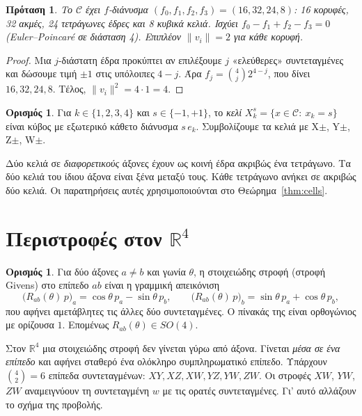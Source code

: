 \documentclass[10pt,a4paper]{article}
\theoremstyle{plain}
\newtheorem{proposition}[theorem]{Πρόταση}
\theoremstyle{definition}
\newtheorem{definition}[theorem]{Ορισμός}
\newcommand{\R}{\mathbb{R}}
\newcommand{\C}{\mathcal{C}}
\newcommand{\eng}[1]{\textenglish{#1}}
\begin{document}
\begin{proposition}\label{prop:fvector}
Το $\C$ έχει $f$-διάνυσμα $(f_0,f_1,f_2,f_3)=(16,32,24,8)$: 16 κορυφές, 32 ακμές, 24 τετράγωνες έδρες και 8 κυβικά κελιά. Ισχύει $f_0-f_1+f_2-f_3=0$ (Euler–Poincaré σε διάσταση 4). Επιπλέον $\|v_i\|=2$ για κάθε κορυφή.
\end{proposition}
\begin{proof}
Μια $j$-διάστατη έδρα προκύπτει αν επιλέξουμε $j$ «ελεύθερες» συντεταγμένες και δώσουμε τιμή $\pm1$ στις υπόλοιπες $4-j$. Άρα $f_j=\binom{4}{j}2^{4-j}$, που δίνει $16,32,24,8$. Τέλος, $\|v_i\|^2=4\cdot1=4$.
\end{proof}

\begin{definition}
Για $k\in\{1,2,3,4\}$ και $s\in\{-1,+1\}$, το \emph{κελί} $X_k^s=\{x\in\C:\ x_k=s\}$ είναι κύβος με εξωτερικό κάθετο διάνυσμα $s\,e_k$. Συμβολίζουμε τα κελιά με X$\pm$, Y$\pm$, Z$\pm$, W$\pm$.
\end{definition}
Δύο κελιά σε \emph{διαφορετικούς} άξονες έχουν ως κοινή έδρα ακριβώς ένα τετράγωνο. Τα δύο κελιά του ίδιου άξονα είναι ξένα μεταξύ τους. Κάθε τετράγωνο ανήκει σε ακριβώς δύο κελιά. Οι παρατηρήσεις αυτές χρησιμοποιούνται στο Θεώρημα~\ref{thm:cells}.

\section{Περιστροφές στον \texorpdfstring{$\R^4$}{R4}}
\begin{definition}
Για δύο άξονες $a\neq b$ και γωνία $\theta$, η στοιχειώδης στροφή (στροφή \eng{Givens}) στο επίπεδο $ab$ είναι η γραμμική απεικόνιση
\[
\bigl(R_{ab}(\theta)\,p\bigr)_a=\cos\theta\,p_a-\sin\theta\,p_b,\qquad
\bigl(R_{ab}(\theta)\,p\bigr)_b=\sin\theta\,p_a+\cos\theta\,p_b,
\]
που αφήνει αμετάβλητες τις άλλες δύο συντεταγμένες. Ο πίνακάς της είναι ορθογώνιος με ορίζουσα $1$. Επομένως $R_{ab}(\theta)\in SO(4)$.
\end{definition}
Στον $\R^4$ μια στοιχειώδης στροφή δεν γίνεται γύρω από άξονα. Γίνεται \emph{μέσα σε ένα επίπεδο} και αφήνει σταθερό ένα ολόκληρο συμπληρωματικό επίπεδο. Υπάρχουν $\binom42=6$ επίπεδα συντεταγμένων: $XY, XZ, XW, YZ, YW, ZW$. Οι στροφές $XW$, $YW$, $ZW$ αναμειγνύουν τη συντεταγμένη $w$ με τις ορατές συντεταγμένες. Γι' αυτό αλλάζουν το σχήμα της προβολής.
\end{document}
